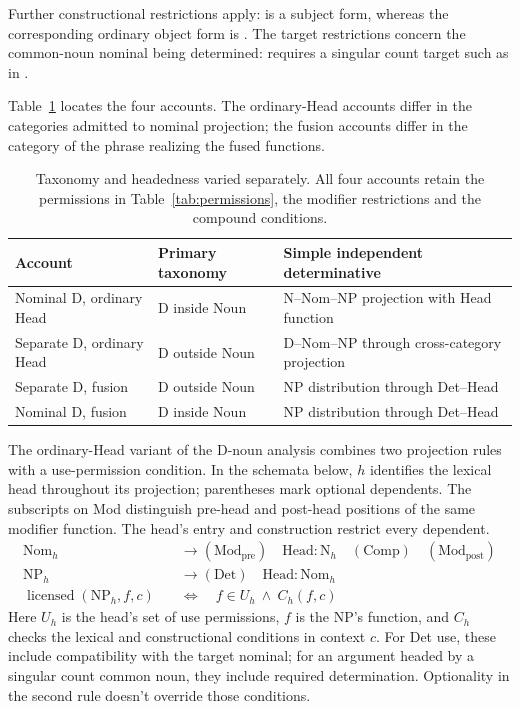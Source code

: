 \documentclass[12pt]{article}
\begin{document}
Further constructional restrictions apply:  is a subject form, whereas the corresponding ordinary object form is . The target restrictions concern the common-noun nominal being determined:  requires a singular count target such as  in .

Table~\ref{tab:economy} locates the four accounts. The ordinary-Head accounts differ in the categories admitted to nominal projection; the fusion accounts differ in the category of the phrase realizing the fused functions.

\begin{table}[H]
\centering\small
\caption{Taxonomy and headedness varied separately. All four accounts retain the permissions in Table~\ref{tab:permissions}, the modifier restrictions and the compound conditions.}\label{tab:economy}
\begin{tabular}{>{\raggedright\arraybackslash}p{3.1cm}>{\raggedright\arraybackslash}p{3.9cm}>{\raggedright\arraybackslash}p{4.7cm}}
\toprule
Account & Primary taxonomy & Simple independent determinative \\
\midrule
Nominal D, ordinary Head & D inside Noun & N--Nom--NP projection with Head function \\
Separate D, ordinary Head & D outside Noun & D--Nom--NP through cross-category projection \\
Separate D, fusion & D outside Noun & NP distribution through Det--Head \\
Nominal D, fusion & D inside Noun & NP distribution through Det--Head \\
\bottomrule
\end{tabular}
\end{table}

The ordinary-Head variant of the D-noun analysis combines two projection rules with a use-permission condition. In the schemata below, $h$ identifies the lexical head throughout its projection; parentheses mark optional dependents. The subscripts on Mod distinguish pre-head and post-head positions of the same modifier function. The head's entry and construction restrict every dependent.
\[
\begin{aligned}
\mathrm{Nom}_{h} &\to (\mathrm{Mod}_{\mathrm{pre}})\quad \mathrm{Head}:\mathrm{N}_{h}\quad (\mathrm{Comp})\quad (\mathrm{Mod}_{\mathrm{post}}) \\
\mathrm{NP}_{h} &\to (\mathrm{Det})\quad \mathrm{Head}:\mathrm{Nom}_{h} \\
\operatorname{licensed}(\mathrm{NP}_{h},f,c)\quad &\Longleftrightarrow\quad f\in U_h\ \land\ C_h(f,c)
\end{aligned}
\]
Here $U_h$ is the head's set of use permissions, $f$ is the NP's function, and $C_h$ checks the lexical and constructional conditions in context $c$. For Det use, these include compatibility with the target nominal; for an argument headed by a singular count common noun, they include required determination. Optionality in the second rule doesn't override those conditions.
\end{document}
